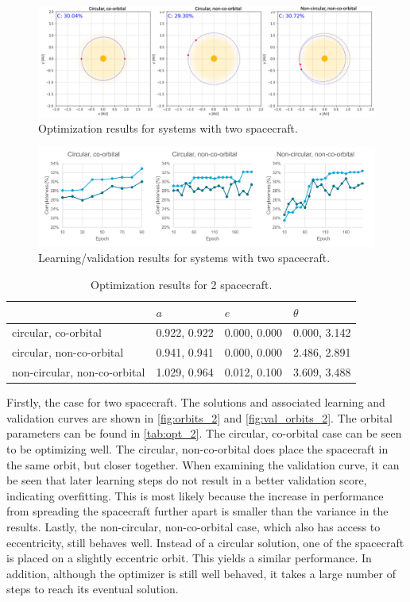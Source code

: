 \begin{figure}[htbp]
 \centering
 \includegraphics[width=1.0\textwidth]{img/orbits_2.png}
 \caption{Optimization results for systems with two spacecraft.}
 \label{fig:orbits_2}
\end{figure}
\begin{figure}[htbp]
 \centering
 \includegraphics[width=1.0\textwidth]{img/val_orbits_2.pdf}
 \caption{Learning/validation results for systems with two spacecraft.}
 \label{fig:val_orbits_2}
\end{figure}

\begin{table}[htbp]
\centering
\caption{Optimization results for 2 spacecraft.}
\label{tab:opt_2}
\begin{tabulary}{1.0\textwidth}{L|LLL}
                             & $a$   & $e$   & $\theta$ \\ \hline
circular, co-orbital         & 0.922, 0.922 & 0.000, 0.000 & 0.000, 3.142   \\
circular, non-co-orbital     & 0.941, 0.941 & 0.000, 0.000 & 2.486, 2.891   \\
non-circular, non-co-orbital & 1.029, 0.964 & 0.012, 0.100 & 3.609, 3.488  
\end{tabulary}
\end{table}

Firstly, the case for two spacecraft. The solutions and associated learning and validation curves are shown in \autoref{fig:orbits_2} and \autoref{fig:val_orbits_2}. The orbital parameters can be found in \autoref{tab:opt_2}. The circular, co-orbital case can be seen to be optimizing well. The circular, non-co-orbital does place the spacecraft in the same orbit, but closer together. When examining the validation curve, it can be seen that later learning steps do not result in a better validation score, indicating overfitting. This is most likely because the increase in performance from spreading the spacecraft further apart is smaller than the variance in the results. Lastly, the non-circular, non-co-orbital case, which also has access to eccentricity, still behaves well. Instead of a circular solution, one of the spacecraft is placed on a slightly eccentric orbit. This yields a similar performance. In addition, although the optimizer is still well behaved, it takes a large number of steps to reach its eventual solution. \\

